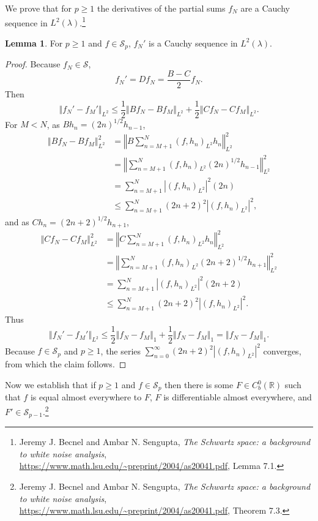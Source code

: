 \documentclass{article}
\newcommand{\norm}[1]{\left\Vert #1 \right\Vert}
\theoremstyle{definition}
\newtheorem{lemma}[theorem]{Lemma}
\theoremstyle{definition}
\begin{document}
We prove that for $p \geq 1$ the derivatives of the partial sums $f_N$ are a Cauchy sequence
in $L^2(\lambda)$.\footnote{Jeremy J. Becnel and Ambar N. Sengupta,
{\em The Schwartz space: a background to white noise analysis},
\url{https://www.math.lsu.edu/~preprint/2004/as20041.pdf}, Lemma 7.1.}

\begin{lemma}
For $p \geq 1$ and $f \in \mathscr{S}_p$, $f_N'$ is a Cauchy sequence in $L^2(\lambda)$.
\label{cauchyL2}
\end{lemma}
\begin{proof}
Because $f_N \in \mathscr{S}$,
\[
f_N' =Df_N= \frac{B-C}{2}f_N.
\]
Then
\[
\norm{f_N'-f_M'}_{L^2} \leq \frac{1}{2}\norm{Bf_N-Bf_M}_{L^2} + \frac{1}{2}\norm{Cf_N-Cf_M}_{L^2}.
\]
For $M<N$, as $Bh_n=(2n)^{1/2}h_{n-1}$,
\begin{align*}
\norm{Bf_N-Bf_M}_{L^2}^2&=\norm{B \sum_{n=M+1}^N (f,h_n)_{L^2} h_n}_{L^2}^2\\
&=\norm{ \sum_{n=M+1}^N (f,h_n)_{L^2} (2n)^{1/2} h_{n-1}}_{L^2}^2\\
&=\sum_{n=M+1}^N |(f,h_n)_{L^2}|^2 (2n)\\
&\leq \sum_{n=M+1}^N (2n+2)^2 |(f,h_n)_{L^2}|^2,
\end{align*}
and as $Ch_n=(2n+2)^{1/2}h_{n+1}$,
\begin{align*}
\norm{Cf_N-Cf_M}_{L^2}^2&=\norm{C \sum_{n=M+1}^N (f,h_n)_{L^2} h_n}_{L^2}^2\\
&=\norm{ \sum_{n=M+1}^N (f,h_n)_{L^2}(2n+2)^{1/2}h_{n+1}}_{L^2}^2\\
&=\sum_{n=M+1}^N |(f,h_n)_{L^2}|^2 (2n+2)\\
&\leq \sum_{n=M+1}^N (2n+2)^2 |(f,h_n)_{L^2}|^2.
\end{align*}
Thus
\[
\norm{f_N'-f_M'}_{L^2} \leq \frac{1}{2}\norm{f_N-f_M}_1 +  \frac{1}{2}\norm{f_N-f_M}_1
= \norm{f_N-f_M}_1.
\]
Because $f \in \mathscr{S}_p$ and $p \geq 1$, 
the series $\sum_{n=0}^\infty (2n+2)^2 |(f,h_n)_{L^2}|^2$ converges, from
which the claim follows.
\end{proof}



Now we establish that if
$p \geq 1$ and $f \in \mathscr{S}_p$ then there is some $F \in C_b^0(\mathbb{R})$ such that $f$ is equal almost everywhere to $F$,
$F$ is differentiable almost everywhere,
and $F'  \in \mathscr{S}_{p-1}$.\footnote{Jeremy J. Becnel and Ambar N. Sengupta,
{\em The Schwartz space: a background to white noise analysis},
\url{https://www.math.lsu.edu/~preprint/2004/as20041.pdf}, Theorem 7.3.}
\end{document}
